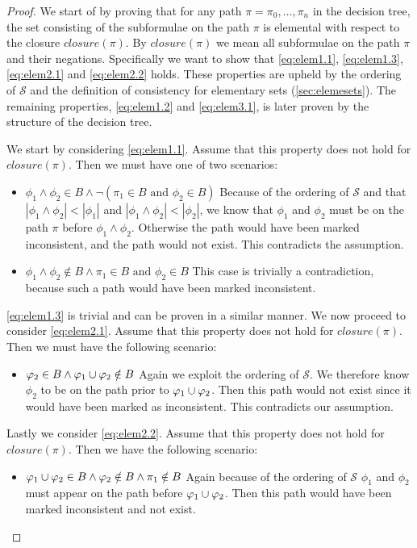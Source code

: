 \begin{proof}
We start of by proving that for any path $\pi=\pi_0,\ldots,\pi_n$ in the decision tree, the set consisting of the subformulae on the path $\pi$ is elemental with respect to the closure $closure(\pi)$. By $closure(\pi)$ we mean all subformulae on the path $\pi$ and their negations. Specifically we want to show that \autoref{eq:elem1.1}, \autoref{eq:elem1.3}, \autoref{eq:elem2.1} and \autoref{eq:elem2.2} holds. These properties are upheld by the ordering of $\mathcal{S}$ and the definition of consistency for elementary sets (\autoref{sec:elemesets}). The remaining properties, \autoref{eq:elem1.2} and \autoref{eq:elem3.1}, is later proven by the structure of the decision tree.

We start by considering \autoref{eq:elem1.1}. Assume that this property does not hold for $closure(\pi)$. Then we must have one of two scenarios:
\begin{itemize}
    \item $\phi_1 \land \phi_2 \in B \land \lnot(\pi_1 \in B \text{ and } \phi_2 \in B)$ \quad
    Because of the ordering of $\mathcal{S}$ and that $|\phi_1 \land \phi_2| < |\phi_1|$ and $|\phi_1 \land \phi_2| < |\phi_2|$, we know that $\phi_1$ and $\phi_2$ must be on the path $\pi$ before $\phi_1 \land \phi_2$. Otherwise the path would have been marked inconsistent, and the path would not exist. This contradicts the assumption.
    \item $\phi_1 \land \phi_2 \notin B \land \pi_1 \in B \text{ and } \phi_2 \in B$ \quad This case is trivially a contradiction, because such a path would have been marked inconsistent.
\end{itemize}
\autoref{eq:elem1.3} is trivial and can be proven in a similar manner. We now proceed to consider \autoref{eq:elem2.1}. Assume that this property does not hold for $closure(\pi)$. Then we must have the following scenario:
\begin{itemize}
    \item $\varphi_2 \in B \land \varphi_1 \cup \varphi_2 \notin B$ \quad
    Again we exploit the ordering of $\mathcal{S}$. We therefore know $\phi_2$ to be on the path prior to $\varphi_1 \cup \varphi_2$. Then this path would not exist since it would have been marked as inconsistent. This contradicts our assumption.
\end{itemize}
Lastly we consider \autoref{eq:elem2.2}. Assume that this property does not hold for $closure(\pi)$. Then we have the following scenario:
\begin{itemize}
    \item $\varphi_1 \cup \varphi_2 \in B \land \varphi_2 \notin B \land \pi_1 \notin B$ \quad Again because of the ordering of $\mathcal{S}$ $\phi_1$ and $\phi_2$ must appear on the path before $\varphi_1 \cup \varphi_2$. Then this path would have been marked inconsistent and not exist.
\end{itemize}


\end{proof}
